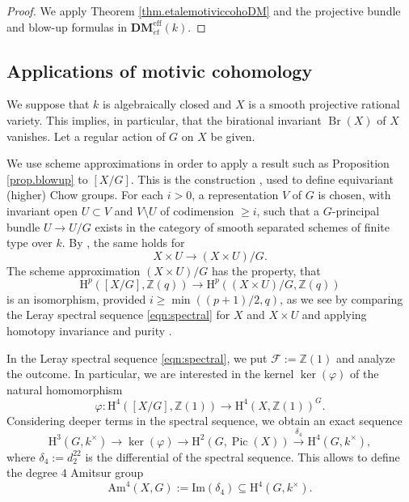 \documentclass[12pt,reqno]{amsart}
\theoremstyle{plain}
\theoremstyle{remark}
\theoremstyle{definition}
\numberwithin{equation}{section}
\newcommand{\Z}{{\mathbb Z}}
\newcommand{\rH}{{\mathrm H}}
\newcommand{\lra}{\longrightarrow}
\newcommand{\bZ}{{\mathbb Z}}
\newcommand{\Am}{\mathrm{Am}}
\DeclareMathOperator{\Pic}{Pic}
\DeclareMathOperator{\Br}{Br}
\begin{document}
\begin{proof}
We apply Theorem \ref{thm.etalemotiviccohoDM} and the projective bundle and blow-up formulas in $\mathbf{DM}_{\acute et}^{\mathrm{eff}}(k)$.
\end{proof}


\subsection*{Applications of motivic cohomology}
We suppose that $k$ is algebraically closed and $X$ is a smooth projective rational variety.
This implies, in particular, that the birational invariant $\Br(X)$ of $X$ vanishes.
Let a regular action of $G$ on $X$ be given.

We use scheme approximations
in order to apply a result such as Proposition \ref{prop.blowup} to $[X/G]$.
This is the construction \cite[Sect. 6.3]{EG},
used to define equivariant (higher) Chow groups.
For each $i>0$, a representation $V$ of $G$ is chosen, with invariant open $U\subset V$ and $V\setminus U$ of codimension $\ge i$, such that a $G$-principal bundle $U\to U/G$ exists in the category of smooth separated schemes of finite type over $k$.
By \cite[Prop.\ 7.1]{mumford-git}, the same holds for
\[ X\times U\to (X\times U)/G. \]
The scheme approximation
$(X\times U)/G$ has the property, that
\[ \rH^p([X/G],\Z(q))\to \rH^p((X\times U)/G,\Z(q)) \]
is an isomorphism, provided $i\ge \min((p+1)/2,q)$,
as we see by
comparing the Leray spectral sequence \eqref{eqn:spectral}
for $X$ and $X\times U$ and applying homotopy invariance and purity
\cite[Prop.\ 3.13]{KN-I}.

In the Leray spectral sequence \eqref{eqn:spectral}, we put $\mathcal F:=\bZ(1)$ and analyze the outcome. In particular, we are interested in the kernel $\ker(\varphi)$ of the natural homomorphism
$$
\varphi\colon\rH^4 ([X/G],\bZ(1)) \to \rH^4(X,\bZ(1))^G. 
$$
Considering deeper terms in the spectral sequence, we obtain an exact sequence
\begin{equation}
\label{eqn.deeper}
\rH^3(G,k^\times)\to \ker(\varphi)\to 
\rH^2(G, \Pic(X)) \stackrel{\delta_4}{\lra} \rH^4(G,k^\times),
\end{equation}
where  $\delta_4:=d_2^{22}$ is the differential of the spectral sequence. 
This allows to define the degree $4$ Amitsur group 
$$
\Am^4(X,G):=\mathrm{Im}(\delta_4) \subseteq \rH^4(G,k^\times). 
$$
\end{document}
